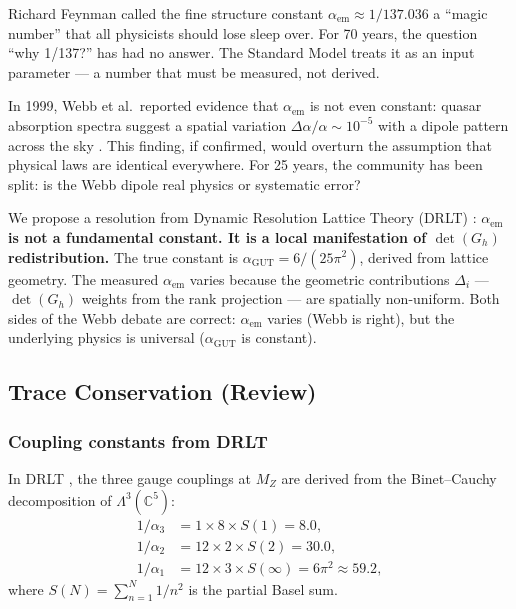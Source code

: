\documentclass[12pt]{article}
\theoremstyle{remark}
\theoremstyle{definition}
\newcommand{\CC}{\mathbb{C}}
\newcommand{\agut}{\alpha_{\mathrm{GUT}}}
\begin{document}
Richard Feynman called the fine structure constant $\alpha_\text{em} \approx 1/137.036$ a ``magic number'' that all physicists should lose sleep over. For 70 years, the question ``why 1/137?'' has had no answer. The Standard Model treats it as an input parameter --- a number that must be measured, not derived.

In 1999, Webb et al.\ reported evidence that $\alpha_\text{em}$ is not even constant: quasar absorption spectra suggest a spatial variation $\Delta\alpha/\alpha \sim 10^{-5}$ with a dipole pattern across the sky \cite{Webb}. This finding, if confirmed, would overturn the assumption that physical laws are identical everywhere. For 25 years, the community has been split: is the Webb dipole real physics or systematic error?

We propose a resolution from Dynamic Resolution Lattice Theory (DRLT) : \textbf{$\alpha_\text{em}$ is not a fundamental constant. It is a local manifestation of $\det(G_h)$ redistribution.} The true constant is $\agut = 6/(25\pi^2)$, derived from lattice geometry. The measured $\alpha_\text{em}$ varies because the geometric contributions $\Delta_i$ --- $\det(G_h)$ weights from the rank projection --- are spatially non-uniform. Both sides of the Webb debate are correct: $\alpha_\text{em}$ varies (Webb is right), but the underlying physics is universal ($\agut$ is constant).

\subsection{Trace Conservation (Review)}

\subsubsection{Coupling constants from DRLT}

In DRLT , the three gauge couplings at $M_Z$ are derived from the Binet--Cauchy decomposition of $\Lambda^3(\CC^5)$:
\begin{align}
1/\alpha_3 &= 1 \times 8 \times S(1) = 8.0, \\
1/\alpha_2 &= 12 \times 2 \times S(2) = 30.0, \\
1/\alpha_1 &= 12 \times 3 \times S(\infty) = 6\pi^2 \approx 59.2,
\end{align}
where $S(N) = \sum_{n=1}^{N} 1/n^2$ is the partial Basel sum.
\end{document}
